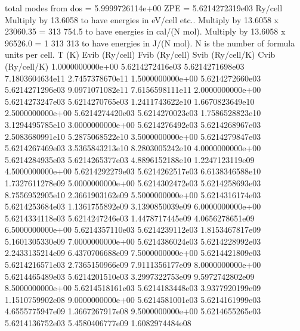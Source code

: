\documentclass[letterpaper,10pt,english]{sphinxmanual}
\begin{document}
\begin{sphinxVerbatim}[commandchars=\\\{\}]
\PYGZsh{} total modes from dos = 5.9999726114e+00
\PYGZsh{} ZPE = 5.6214272319e\PYGZhy{}03 Ry/cell
\PYGZsh{} Multiply by 13.6058 to have energies in eV/cell etc..
\PYGZsh{} Multiply by 13.6058 x 23060.35 = 313 754.5 to have energies in cal/(N mol).
\PYGZsh{} Multiply by 13.6058 x 96526.0 = 1 313 313 to have energies in J/(N mol).
\PYGZsh{} N is the number of formula units per cell.
\PYGZsh{}
\PYGZsh{} T (K) 	Evib (Ry/cell)	Fvib (Ry/cell)	Svib (Ry/cell/K)	Cvib (Ry/cell/K)
1.0000000000e+00	5.6214272416e\PYGZhy{}03	5.6214271698e\PYGZhy{}03	7.1803604634e\PYGZhy{}11	2.7457378670e\PYGZhy{}11
1.5000000000e+00	5.6214272660e\PYGZhy{}03	5.6214271296e\PYGZhy{}03	9.0971071082e\PYGZhy{}11	7.6156598111e\PYGZhy{}11
2.0000000000e+00	5.6214273247e\PYGZhy{}03	5.6214270765e\PYGZhy{}03	1.2411743622e\PYGZhy{}10	1.6670823649e\PYGZhy{}10
2.5000000000e+00	5.6214274420e\PYGZhy{}03	5.6214270023e\PYGZhy{}03	1.7586528823e\PYGZhy{}10	3.1294495785e\PYGZhy{}10
3.0000000000e+00	5.6214276492e\PYGZhy{}03	5.6214268967e\PYGZhy{}03	2.5083680991e\PYGZhy{}10	5.2875068522e\PYGZhy{}10
3.5000000000e+00	5.6214279847e\PYGZhy{}03	5.6214267469e\PYGZhy{}03	3.5365843213e\PYGZhy{}10	8.2803005242e\PYGZhy{}10
4.0000000000e+00	5.6214284935e\PYGZhy{}03	5.6214265377e\PYGZhy{}03	4.8896152188e\PYGZhy{}10	1.2247123119e\PYGZhy{}09
4.5000000000e+00	5.6214292279e\PYGZhy{}03	5.6214262517e\PYGZhy{}03	6.6138346588e\PYGZhy{}10	1.7327611278e\PYGZhy{}09
5.0000000000e+00	5.6214302472e\PYGZhy{}03	5.6214258693e\PYGZhy{}03	8.7556952905e\PYGZhy{}10	2.3661903162e\PYGZhy{}09
5.5000000000e+00	5.6214316174e\PYGZhy{}03	5.6214253684e\PYGZhy{}03	1.1361755892e\PYGZhy{}09	3.1390850039e\PYGZhy{}09
6.0000000000e+00	5.6214334118e\PYGZhy{}03	5.6214247246e\PYGZhy{}03	1.4478717445e\PYGZhy{}09	4.0656278651e\PYGZhy{}09
6.5000000000e+00	5.6214357110e\PYGZhy{}03	5.6214239112e\PYGZhy{}03	1.8153467817e\PYGZhy{}09	5.1601305330e\PYGZhy{}09
7.0000000000e+00	5.6214386024e\PYGZhy{}03	5.6214228992e\PYGZhy{}03	2.2433135214e\PYGZhy{}09	6.4370706688e\PYGZhy{}09
7.5000000000e+00	5.6214421809e\PYGZhy{}03	5.6214216571e\PYGZhy{}03	2.7365150966e\PYGZhy{}09	7.9111356177e\PYGZhy{}09
8.0000000000e+00	5.6214465489e\PYGZhy{}03	5.6214201510e\PYGZhy{}03	3.2997322753e\PYGZhy{}09	9.5972742802e\PYGZhy{}09
8.5000000000e+00	5.6214518161e\PYGZhy{}03	5.6214183448e\PYGZhy{}03	3.9377920199e\PYGZhy{}09	1.1510759902e\PYGZhy{}08
9.0000000000e+00	5.6214581001e\PYGZhy{}03	5.6214161999e\PYGZhy{}03	4.6555775947e\PYGZhy{}09	1.3667267917e\PYGZhy{}08
9.5000000000e+00	5.6214655265e\PYGZhy{}03	5.6214136752e\PYGZhy{}03	5.4580406777e\PYGZhy{}09	1.6082974484e\PYGZhy{}08

\end{sphinxVerbatim}
\end{document}
